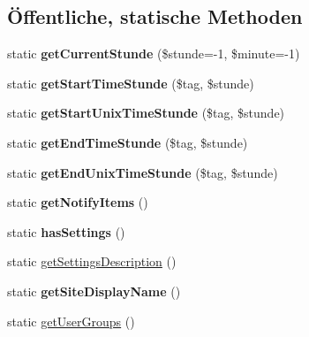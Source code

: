 \subsection*{Öffentliche, statische Methoden}
\begin{DoxyCompactItemize}
\item 
\mbox{\label{classstundenplan_adf773be4b7a73458b5f90b5860fa1a7f}} 
static {\bfseries get\+Current\+Stunde} (\$stunde=-\/1, \$minute=-\/1)
\item 
\mbox{\label{classstundenplan_adf21cc12124807b9795876b03d68ce84}} 
static {\bfseries get\+Start\+Time\+Stunde} (\$tag, \$stunde)
\item 
\mbox{\label{classstundenplan_a3a40511b7b3d8e5e1af50b6d1cbde51c}} 
static {\bfseries get\+Start\+Unix\+Time\+Stunde} (\$tag, \$stunde)
\item 
\mbox{\label{classstundenplan_a3fbf11f8b99718e75488d8c66287d5a0}} 
static {\bfseries get\+End\+Time\+Stunde} (\$tag, \$stunde)
\item 
\mbox{\label{classstundenplan_a90726d2625150a34bf31b1a8ff58d01c}} 
static {\bfseries get\+End\+Unix\+Time\+Stunde} (\$tag, \$stunde)
\item 
\mbox{\label{classstundenplan_a9a155984999460e10f30629d340d62f2}} 
static {\bfseries get\+Notify\+Items} ()
\item 
\mbox{\label{classstundenplan_af8848e79451899aa020c2612643ac098}} 
static {\bfseries has\+Settings} ()
\item 
static \mbox{\hyperlink{classstundenplan_a9e78f27f1c9932e0e2e5e60dc0aa01fb}{get\+Settings\+Description}} ()
\item 
\mbox{\label{classstundenplan_a7928db8eeecc1db6d74a4db6dbd5313a}} 
static {\bfseries get\+Site\+Display\+Name} ()
\item 
static \mbox{\hyperlink{classstundenplan_a443935b019eb9ba15cc77d513f4fcac6}{get\+User\+Groups}} ()
\item 
\mbox{\label{classstundenplan_a74fb6c8da551aeff6dfdcac7d7f9eb71}} 

\end{DoxyCompactItemize}
